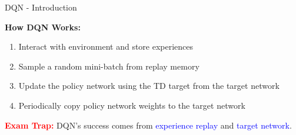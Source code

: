 \documentclass[8pt]{beamer}
\begin{document}
\begin{frame}{DQN - Introduction}
\begin{center}
\end{center}

	
	\textbf{How DQN Works:}
	\begin{enumerate}
		\item Interact with environment and store experiences
		\item Sample a random mini-batch from replay memory
		\item Update the policy network using the TD target from the target network
		\item Periodically copy policy network weights to the target network
	\end{enumerate}
	
	\textcolor{red}{\textbf{Exam Trap:}} DQN's success comes from
	\textcolor{blue}{experience replay} and \textcolor{blue}{target network}.
\end{frame}
\end{document}
